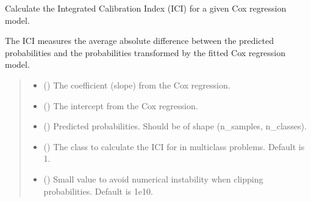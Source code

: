 \documentclass[letterpaper,10pt,english]{sphinxmanual}
\begin{document}

\begin{fulllineitems}
\label{\detokenize{calzone:calzone.metrics.cal_ICI_cox}}
\pysigstartsignatures
{}
\pysigstopsignatures
\sphinxAtStartPar
Calculate the Integrated Calibration Index (ICI) for a given Cox regression model.

\sphinxAtStartPar
The ICI measures the average absolute difference between the predicted probabilities
and the probabilities transformed by the fitted Cox regression model.
\begin{quote}\begin{description}
\begin{itemize}
\item {} 
\sphinxAtStartPar
{} () \textendash{} The coefficient (slope) from the Cox regression.

\item {} 
\sphinxAtStartPar
{} () \textendash{} The intercept from the Cox regression.

\item {} 
\sphinxAtStartPar
{} () \textendash{} Predicted probabilities. Should be of shape (n\_samples, n\_classes).

\item {} 
\sphinxAtStartPar
{} () \textendash{} The class to calculate the ICI for in multi\sphinxhyphen{}class problems. Default is 1.

\item {} 
\sphinxAtStartPar
{} () \textendash{} Small value to avoid numerical instability when clipping probabilities. Default is 1e\sphinxhyphen{}10.


\end{itemize}
\end{description}
\end{quote}
\end{fulllineitems}
\end{document}
